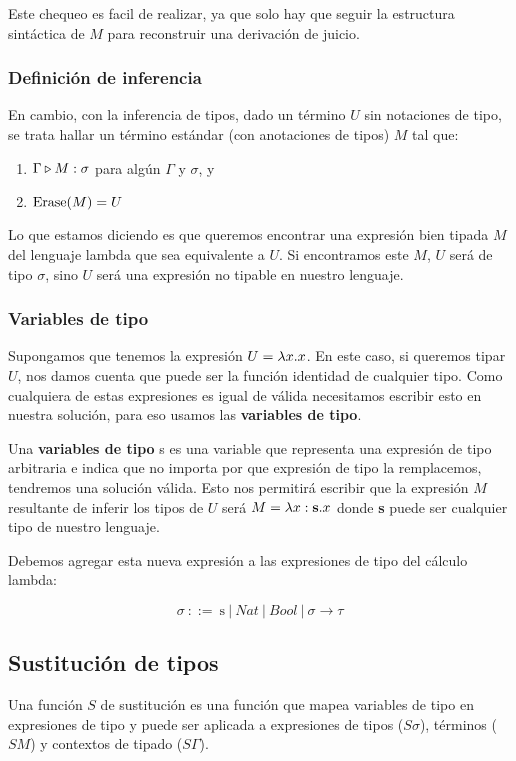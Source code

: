 Este chequeo  es facil de realizar, ya que solo hay que seguir la estructura sintáctica de $M$ para reconstruir una derivación de juicio. 

\subsubsection*{Definición de inferencia}
En cambio, con la inferencia de tipos, dado un término $U$ sin notaciones de tipo, se trata hallar un término estándar (con anotaciones de tipos) $M$ tal que:
\begin{enumerate}
	\item $\Gamma\triangleright M : \sigma$ para algún $\Gamma$ y $\sigma$, y
	\item $\operatorname{Erase}(M) = U$
\end{enumerate}

Lo que estamos diciendo es que queremos encontrar una expresión bien tipada $M$ del lenguaje lambda que sea equivalente a $U$. Si encontramos este $M$, $U$ será de tipo $\sigma$, sino $U$ será una expresión no tipable en nuestro lenguaje.


\subsubsection{Variables de tipo}
Supongamos que tenemos la expresión $U = \lambda x. x$. En este caso, si queremos tipar $U$, nos damos cuenta que puede ser la función identidad de cualquier tipo. Como cualquiera de estas expresiones es igual de válida necesitamos escribir esto en nuestra solución, para eso usamos las \textbf{variables de tipo}.

Una \textbf{variables de tipo} s es una variable que representa una expresión de tipo arbitraria e indica que no importa por que expresión de tipo la remplacemos, tendremos una solución válida. Esto nos permitirá escribir que la expresión $M$ resultante de inferir los tipos de $U$ será $M=\lambda x: \textbf{s} . x$ donde \textbf{s} puede ser cualquier tipo de nuestro lenguaje.

Debemos agregar esta nueva expresión a las expresiones  de tipo del cálculo lambda:

$$\sigma~::=~\text{s}~|~Nat~|~Bool~|~\sigma\to\tau$$


\subsection{Sustitución de tipos}
Una función $S$ de sustitución es una función que mapea variables de tipo en expresiones de tipo y puede ser aplicada a expresiones de tipos ($S\sigma$), términos ($SM$) y contextos de tipado ($S\Gamma$).

